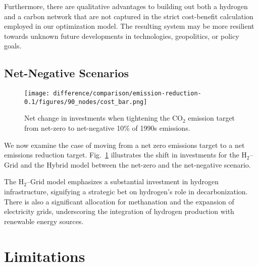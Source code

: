 \documentclass[twocolumn]{article}
\newcommand{\carbon}{CO$_2$}
\newcommand{\hydrogen}{H$_2$}
\newcommand{\hydrogengrid}{\hydrogen{}--Grid}
\begin{document}
Furthermore, there are qualitative advantages to building out both a hydrogen and a carbon network that are not captured in the strict cost-benefit calculation employed in our optimization model. The resulting system may be more resilient towards unknown future developments in technologies, geopolitics, or policy goals.


\subsection*{Net-Negative Scenarios}

\begin{figure}[h]
    \centering
    \texttt{[image: difference/comparison/emission-reduction-0.1/figures/90\_nodes/cost\_bar.png]}
    \caption[short]{Net change in investments when tightening the \carbon{} emission target from net-zero to net-negative 10\% of 1990s emissions.}
    \label{fig:net-negative_cost_bar}
\end{figure}

We now examine the case of moving from a net zero emissions target to a net emissions reduction target. Fig.~\ref{fig:net-negative_cost_bar} illustrates the shift in investments for the \hydrogengrid{} and the Hybrid model between the net-zero and the net-negative scenario.




The \hydrogengrid{} model emphasizes a substantial investment in hydrogen infrastructure, signifying a strategic bet on hydrogen's role in decarbonization. There is also a significant allocation for methanation and the expansion of electricity grids, underscoring the integration of hydrogen production with renewable energy sources.





\section{Limitations}
\label{sec:limitations}
\end{document}
